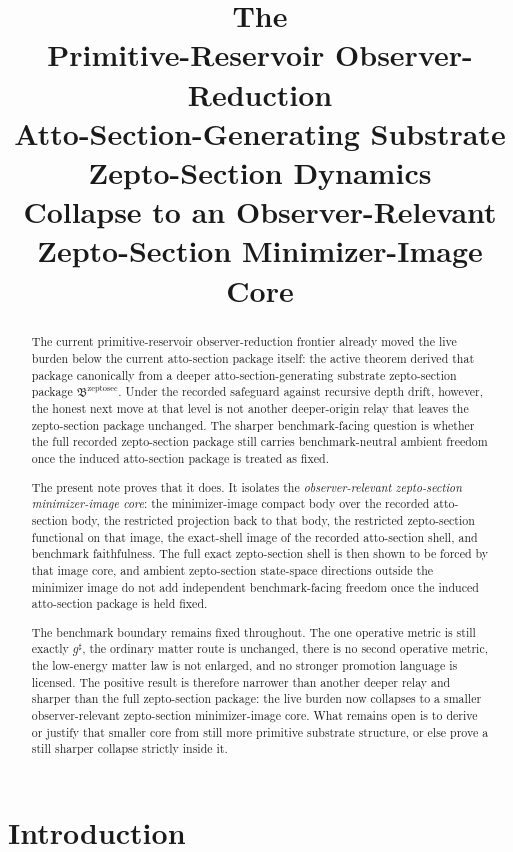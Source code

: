\documentclass[11pt]{article}
\title{\textbf{The \TheoryName{}}\\[0.4em]
\large Primitive-Reservoir Observer-Reduction\\
\large Atto-Section-Generating Substrate Zepto-Section Dynamics\\
\large Collapse to an Observer-Relevant Zepto-Section Minimizer-Image Core}
\author{}
\date{}
\newcommand{\CompletedMetric}{g^{\sharp}}
\newcommand{\ZeptoSectionPackage}{\mathfrak B^{\mathrm{zeptosec}}}
\begin{document}
\maketitle

\begin{abstract}
The current primitive-reservoir observer-reduction frontier already moved the live burden below the current atto-section package itself: the active theorem derived that package canonically from a deeper atto-section-generating substrate zepto-section package \(\ZeptoSectionPackage\). Under the recorded safeguard against recursive depth drift, however, the honest next move at that level is not another deeper-origin relay that leaves the zepto-section package unchanged. The sharper benchmark-facing question is whether the full recorded zepto-section package still carries benchmark-neutral ambient freedom once the induced atto-section package is treated as fixed.

The present note proves that it does. It isolates the \emph{observer-relevant zepto-section minimizer-image core}: the minimizer-image compact body over the recorded atto-section body, the restricted projection back to that body, the restricted zepto-section functional on that image, the exact-shell image of the recorded atto-section shell, and benchmark faithfulness. The full exact zepto-section shell is then shown to be forced by that image core, and ambient zepto-section state-space directions outside the minimizer image do not add independent benchmark-facing freedom once the induced atto-section package is held fixed.

The benchmark boundary remains fixed throughout. The one operative metric is still exactly \(\CompletedMetric\), the ordinary matter route is unchanged, there is no second operative metric, the low-energy matter law is not enlarged, and no stronger promotion language is licensed. The positive result is therefore narrower than another deeper relay and sharper than the full zepto-section package: the live burden now collapses to a smaller observer-relevant zepto-section minimizer-image core. What remains open is to derive or justify that smaller core from still more primitive substrate structure, or else prove a still sharper collapse strictly inside it.
\end{abstract}

\section{Introduction}
\end{document}
